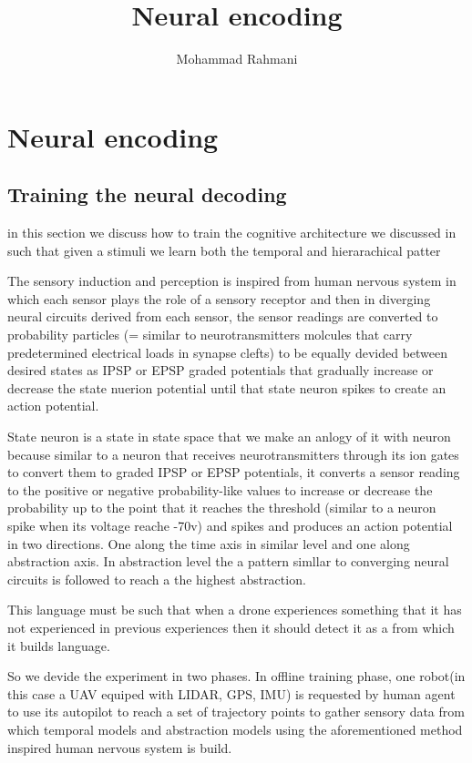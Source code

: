 \documentclass[a4paper]{article}
\title{Neural encoding}
\date{}
\author{Mohammad Rahmani}
\begin{document}
    \maketitle
    
    
    \section{Neural encoding}
        
        \subsection{Training the neural decoding}
            in this section we discuss how to train the cognitive architecture we discussed in  such that given a stimuli we learn both the temporal and hierarachical patter
            
            
            The sensory induction and perception is inspired from human nervous system in which each sensor plays the role of a sensory receptor and then in diverging neural circuits derived from each sensor, the sensor readings are converted to probability particles (= similar to neurotransmitters molcules that carry predetermined electrical loads in synapse clefts) to be equally devided between desired states as IPSP or EPSP graded potentials that gradually increase or decrease the state nuerion potential until that state neuron spikes to create an action potential.
            
            State neuron is a state in state space that we make an anlogy of it with neuron because similar to a neuron that receives neurotransmitters through its ion gates to convert them to graded IPSP or EPSP potentials, it converts a sensor reading to the positive or negative probability-like values to increase or decrease the probability up to the point that it reaches the threshold (similar to a neuron spike when its voltage reache -70v) and spikes and produces an action potential in two directions. One along the time axis in similar level and one along abstraction axis.
            In abstraction level the a pattern simllar to converging neural circuits is followed to reach a the highest abstraction.
            
            
            This language must be such that when a drone experiences something that it has not experienced in previous experiences then it should detect it as a from which it builds language.
            
            So we devide the experiment in two phases. In offline training phase, one robot(in this case a UAV equiped with LIDAR, GPS, IMU) is requested by human agent to use its autopilot to reach a set of trajectory points to gather sensory data from which temporal models and abstraction models using the aforementioned method inspired human nervous system is build.
            
\end{document}
